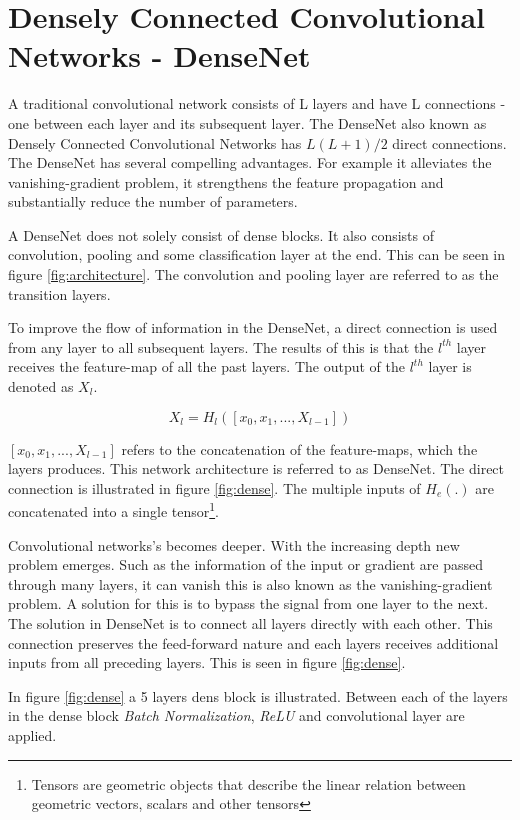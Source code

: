 \section{Densely Connected Convolutional Networks - DenseNet}

A traditional convolutional network consists of L layers and have L connections - one between each layer and its subsequent layer. The DenseNet also known as Densely Connected Convolutional Networks has $L(L+1)/2$ direct connections. The DenseNet has several compelling advantages. For example it alleviates the vanishing-gradient problem, it strengthens the feature propagation and substantially reduce the number of parameters.

A DenseNet does not solely consist of dense blocks. It also consists of convolution, pooling and some classification layer at the end. This can be seen in figure \ref{fig:architecture}. The convolution and pooling layer are referred to as the transition layers.


To improve the flow of information in the DenseNet, a direct connection is used from any layer to all subsequent layers. The results of this is that the $l^{th}$ layer receives the feature-map of all the past layers. The output of the $l^{th}$ layer is denoted as $X_l$.

\begin{equation}
X_l=H_l([x_0,x_1,...,X_{l-1}])
\end{equation}

$[x_0,x_1,...,X_{l-1}]$ refers to the concatenation of the feature-maps, which the layers produces. This network architecture is referred to as DenseNet. The direct connection is illustrated in figure \ref{fig:dense}. The multiple inputs of $H_e(.)$ are concatenated into a single tensor\footnote{Tensors are geometric objects that describe the linear relation between geometric vectors, scalars and other tensors}.

Convolutional networks's becomes deeper. With the increasing depth new problem emerges. Such as the information of the input or gradient are passed through many layers, it can vanish this is also known as the vanishing-gradient problem. A solution for this is to bypass the signal from one layer to the next. The solution in DenseNet is to connect all layers directly with each other. This connection preserves the feed-forward nature and each layers receives additional inputs from all preceding layers. This is seen in figure \ref{fig:dense}.


In figure \ref{fig:dense} a 5 layers dens block is illustrated. Between each of the layers in the dense block \emph{Batch Normalization}, \emph{ReLU} and convolutional layer are applied.
